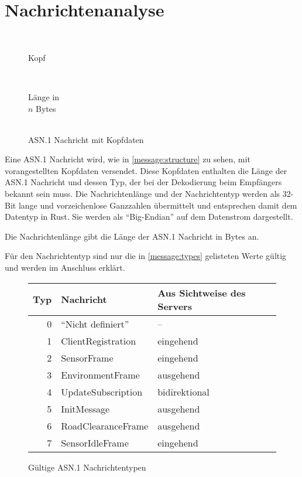 \newpage
\section{Nachrichtenanalyse}
\label{analysis:messages}

\begin{wrapfigure}{R}[-1.5em]{.5\textwidth}
	\centering
	\begin{bytefield}[bitwidth=.45em,bitheight=.7em]{32}
		 \\
		
		\begin{rightwordgroup}{Kopf}
			 \\
		\end{rightwordgroup} \\
		
		\begin{rightwordgroup}{Länge in\\\textbf{$n$} Bytes}
			 \\
			\skippedwords \\
		\end{rightwordgroup}
	\end{bytefield}
	\caption{ASN.1 Nachricht mit Kopfdaten}
	\label{message:structure}
\end{wrapfigure}

Eine ASN.1 Nachricht wird, wie in \autoref{message:structure} zu sehen, mit  vorangestellten Kopfdaten versendet.
Diese Kopfdaten enthalten die Länge der ASN.1 Nachricht und dessen Typ, der bei der Dekodierung beim Empfängers bekannt sein muss.
Die Nachrichtenlänge und der Nachrichtentyp werden als 32-Bit lange und vorzeichenlose Ganzzahlen übermittelt und entsprechen damit dem Datentyp  in Rust.
Sie werden als \enquote{Big-Endian} auf dem Datenstrom dargestellt.

Die Nachrichtenlänge gibt die Länge der ASN.1 Nachricht in Bytes an.

Für den Nachrichtentyp sind nur die in \autoref{message:types} gelisteten Werte gültig und werden im Anschluss erklärt.

\begin{figure}[H]
	\centering
	\begin{tabular}{r|l|l}
		Typ & Nachricht & Aus Sichtweise des Servers \\
		\hline
		0 & \enquote{Nicht definiert} & -- \\
		1 & ClientRegistration & eingehend \\
		2 & SensorFrame & eingehend \\
		3 & EnvironmentFrame & ausgehend \\
		4 & UpdateSubscription & bidirektional \\
		5 & InitMessage & ausgehend \\
		6 & RoadClearanceFrame & ausgehend \\
		7 & SensorIdleFrame & eingehend \\
	\end{tabular}
	\caption{Gültige ASN.1 Nachrichtentypen}
	\label{message:types}
\end{figure}


